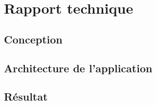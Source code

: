 \chapter{Rapport technique}

\section{Conception}

\section{Architecture de l'application}

\section{Résultat}